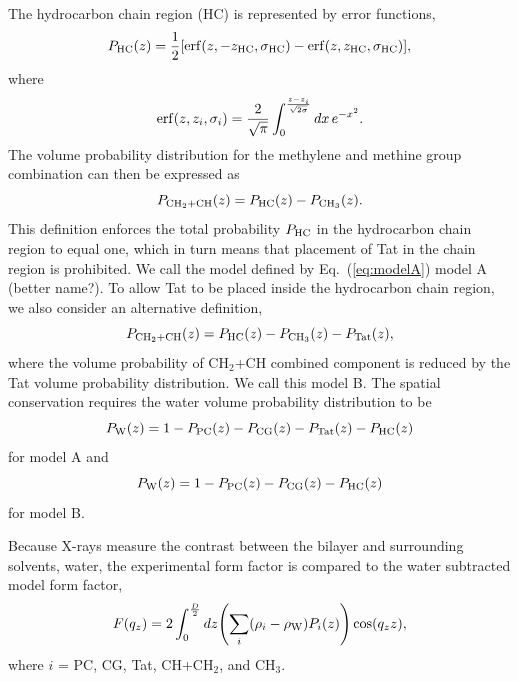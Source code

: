 The hydrocarbon chain region (HC) is represented by error functions,
\begin{equation}
  P_\textrm{HC}(z) = \frac{1}{2}\mathopen{}\left[ 
    \mathrm{erf}(z,-z_\textrm{HC},\sigma_\textrm{HC}) - \mathrm{erf}(z,z_\textrm{HC},\sigma_\textrm{HC})
   \right]\mathclose{},
\end{equation}
where
\begin{equation}
  \mathrm{erf}(z,z_i,\sigma_i)=\frac{2}{\sqrt{\pi}}
    \int_0^{\frac{z-z_i}{\sqrt{2\sigma}}} \mathop{dx} e^{-x^2}.
\end{equation}
The volume probability distribution for the methylene and methine group
combination can then be expressed as
\begin{equation}
  P_{\textrm{CH}_2+\textrm{CH}}(z) = P_\textrm{HC}(z)-P_{\textrm{CH}_3}(z).
  \label{eq:modelA}
\end{equation}
This definition enforces the total probability $P_\textrm{HC}$ in the hydrocarbon
chain region to equal one, which in turn means that placement of Tat in the  
chain region is prohibited. We call the model defined by Eq.~(\ref{eq:modelA})
model A (better name?). To allow Tat to be placed inside the hydrocarbon
chain region, we also consider an alternative definition,
\begin{equation}
  P_{\textrm{CH}_2+\textrm{CH}}(z) = P_\textrm{HC}(z)-P_{\textrm{CH}_3}(z) - P_\textrm{Tat}(z),
\end{equation}
where the volume probability of CH$_2$+CH combined component is reduced by 
the Tat volume probability distribution. We call this model B.
The spatial conservation requires the water volume probability distribution 
to be
\begin{equation}
  P_\textrm{W}(z) = 1-P_\textrm{PC}(z)-P_\textrm{CG}(z)-P_\textrm{Tat}(z)-P_\textrm{HC}(z)
\end{equation}
for model A and
\begin{equation}
  P_\textrm{W}(z) = 1-P_\textrm{PC}(z)-P_\textrm{CG}(z)-P_\textrm{HC}(z)
\end{equation}
for model B. 

Because X-rays measure the contrast between the bilayer and surrounding solvents, 
water, the experimental form factor is compared to the water subtracted model
form factor,
\begin{equation}
  F(q_z) = 2\int_0^{\frac{D}{2}} \mathop{dz} \mathopen{}\left( 
    \sum_i(\rho_i-\rho_\textrm{W})P_i(z)
   \right)\mathclose{} \cos(q_zz),
\end{equation}
where $i$ = PC, CG, Tat, CH+CH$_2$, and CH$_3$.

